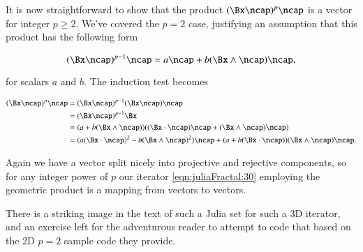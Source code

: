 It is now straightforward to show that the product $(\Bx \ncap)^p \ncap$ is a vector for integer $p \ge 2$.  We've covered the $p=2$ case, justifying an assumption that this product has the following form

\begin{equation}\label{eqn:juliaFractal:60}
(\Bx \ncap)^{p-1} \ncap = a \ncap + b (\Bx \wedge \ncap) \ncap,
\end{equation}

for scalars $a$ and $b$.  The induction test becomes

\begin{align*}
(\Bx \ncap)^{p} \ncap 
&= (\Bx \ncap)^{p-1} (\Bx \ncap) \ncap \\
&= (\Bx \ncap)^{p-1} \Bx \\
&= (a + b (\Bx \wedge \ncap) ) ((\Bx \cdot \ncap )\ncap + (\Bx \wedge \ncap) \ncap) \\
&= 
( a(\Bx \cdot \ncap )^2 - b (\Bx \wedge \ncap)^2 ) \ncap
+ ( a + b(\Bx \cdot \ncap ) ) (\Bx \wedge \ncap) \ncap.
\end{align*}

Again we have a vector split nicely into projective and rejective components, so for any integer power of $p$ our iterator \ref{eqn:juliaFractal:30} employing the geometric product is a mapping from vectors to vectors.

There is a striking image in the text of such a Julia set for such a 3D iterator, and an exercise left for the adventurous reader to attempt to code that based on the 2D $p=2$ sample code they provide.

\EndArticle

